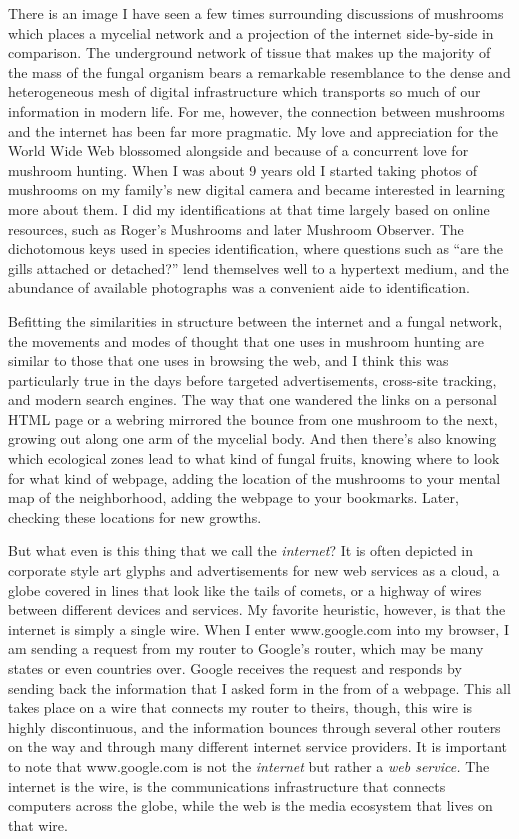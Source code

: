 \documentclass[12pt,letterpaper]{article}
\begin{document}
	There is an image I have seen a few times surrounding discussions of 
	mushrooms which places a mycelial network and a projection of the 
	internet side-by-side
	in comparison. The underground network of tissue that makes up the 
	majority of the mass of the fungal organism bears a remarkable 
	resemblance to the dense and heterogeneous mesh of digital 
	infrastructure which transports so much of our information in modern 
	life. For me, 
	however, the connection between mushrooms and the internet has been far
	more pragmatic. My love and appreciation for the World Wide Web 
	blossomed alongside and because of a concurrent love for mushroom 
	hunting. When I was about 9 years old  I started taking photos of 
	mushrooms on my 
	family's new digital camera and became interested in learning
	more about them. I did my identifications at that time largely based on
	online resources, such as Roger's Mushrooms and later Mushroom Observer.
	The dichotomous keys used in species identification, where questions 
	such as ``are the gills attached or detached?'' lend themselves well to
	a hypertext medium, and the abundance of available photographs was a 
	convenient aide to identification.

	Befitting the similarities in structure between the internet and a 
	fungal network, the movements and modes of thought that one uses in 
	mushroom hunting are similar to those that one uses in browsing the web,
	and I think this was particularly true in the days before targeted 
	advertisements, cross-site tracking, and modern search engines. The way
	that one wandered the links on a personal HTML page or a webring 
	mirrored the bounce from one mushroom to the next, growing out along one
	arm of the mycelial body. And then there's also knowing which ecological
	zones lead to what kind of fungal fruits, knowing where to look for what
	kind of webpage, adding the location of the mushrooms to your mental map
	of the neighborhood, adding the webpage to your bookmarks. Later, 
	checking these locations for new growths.  

	But what even is this thing that we call the \textit{internet}? It is 
	often depicted in corporate style art glyphs and advertisements for new
	web services as a cloud, a globe covered in lines that look like the 
	tails of comets, or a highway of wires between different devices and 
	services. My favorite heuristic, however, is that the internet is simply
	a single wire. When I enter www.google.com into my browser, I am sending
	a request from my router to Google's router, which may be many states or
	even countries over. Google receives the request and responds by sending
	back the information that I asked form in the from of a webpage. This 
	all takes place on a wire that connects my router to theirs, though, 
	this wire is highly discontinuous, and the information bounces through 
	several other routers on the way and through many different internet 
	service providers. It is important to note that www.google.com is not 
	the \textit{internet} but rather a \textit{web service.} The internet is
	the wire, is the communications infrastructure that connects computers 
	across the globe, while the web is the media ecosystem that lives on 
	that wire.
\end{document}
